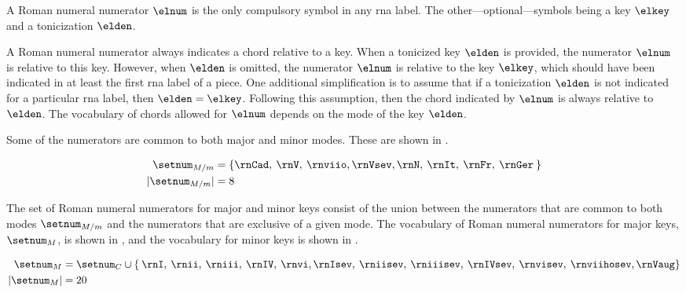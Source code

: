 
A Roman numeral numerator $\elnum$ is the only compulsory
symbol in any \gls{rna} label. The
other---optional---symbols being a key $\elkey$ and a
tonicization $\elden$.

A Roman numeral numerator always indicates a chord relative
to a key. When a tonicized key $\elden$ is provided, the
numerator $\elnum$ is relative to this key. However, when
$\elden$ is omitted, the numerator $\elnum$ is relative to
the key $\elkey$, which should have been indicated in at
least the first \gls{rna} label of a piece. One additional
simplification is to assume that if a tonicization $\elden$
is not indicated for a particular \gls{rna} label, then
$\elden = \elkey$. Following this assumption, then the chord
indicated by $\elnum$ is always relative to $\elden$. The
vocabulary of chords allowed for $\elnum$ depends on the
mode of the key $\elden$.

Some of the numerators are common to both major and minor
modes. These are shown in . 

\begin{equation}
    \label{eq:common_numerators}
    \begin{split}
    \setnum_{M/m} &= \{ \rnCad, \: \rnV, \: \rnviio,
    \rnVsev, \rnN, \: \rnIt, \: \rnFr, \: \rnGer \: \} \\
    | \setnum_{M/m} | &= 8
    \end{split}
\end{equation}

The set of Roman numeral numerators for major and minor keys
consist of the union between the numerators that are common
to both modes $\setnum_{M/m}$ and the numerators that are
exclusive of a given mode. The vocabulary of Roman numeral
numerators for major keys, $\setnum_{M}$, is shown in
, and the vocabulary for minor keys
is shown in .

\begin{equation}
    \label{eq:major_numerators}
    \begin{split}
    \setnum_{M} &= \setnum_{C} \cup \{ \: \rnI, \: \rnii, \: 
    \rniii, \: \rnIV, \: \rnvi, \rnIsev, \: \rniisev, \: 
    \rniiisev, \: \rnIVsev, \: \rnvisev, \: \rnviihosev, \rnVaug \} \\
    | \setnum_{M} | &= 20
    \end{split}
\end{equation}

